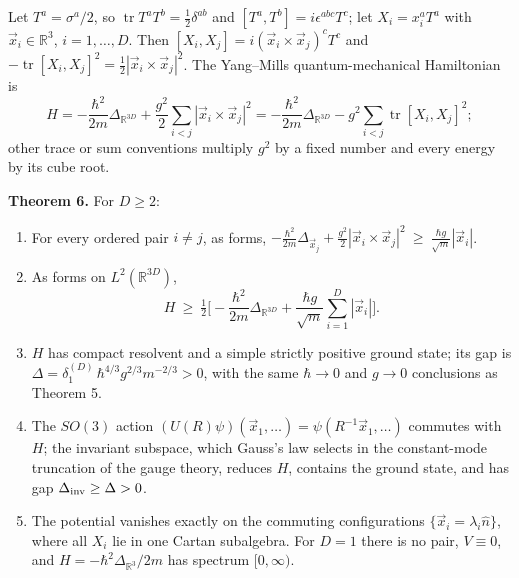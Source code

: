 \documentclass[11pt,a4paper]{article}
\newcommand{\tightlist}{\setlength{\itemsep}{0pt}\setlength{\parskip}{0pt}}
\begin{document}
Let \(T^a=\sigma^a/2\), so
\(\operatorname{tr}T^aT^b=\tfrac12\delta^{ab}\) and
\([T^a,T^b]=i\epsilon^{abc}T^c\); let \(X_i=x_i^aT^a\) with
\(\vec x_i\in\mathbb R^3\), \(i=1,\dots,D\). Then
\([X_i,X_j]=i(\vec x_i\times\vec x_j)^cT^c\) and
\(-\operatorname{tr}[X_i,X_j]^2=\tfrac12|\vec x_i\times\vec x_j|^2\).
The Yang--Mills quantum-mechanical Hamiltonian is
\[H=-\frac{\hbar^2}{2m}\Delta_{\mathbb R^{3D}}
+\frac{g^2}{2}\sum_{i<j}|\vec x_i\times\vec x_j|^2
=-\frac{\hbar^2}{2m}\Delta_{\mathbb R^{3D}}-g^2\sum_{i<j}\operatorname{tr}[X_i,X_j]^2 ;\]
other trace or sum conventions multiply \(g^2\) by a fixed number and
every energy by its cube root.

\textbf{Theorem 6.} For \(D\ge2\):

\begin{enumerate}
\def\labelenumi{\arabic{enumi}.}
\tightlist
\item
  For every ordered pair \(i\neq j\), as forms,
  \(-\frac{\hbar^2}{2m}\Delta_{\vec x_j}+\frac{g^2}{2}|\vec x_i\times\vec x_j|^2 \ \ge\ \frac{\hbar g}{\sqrt m}|\vec x_i|\).
\item
  As forms on \(L^2(\mathbb R^{3D})\),
  \[H\ \ge\ \tfrac12\Big[-\frac{\hbar^2}{2m}\Delta_{\mathbb R^{3D}}
  +\frac{\hbar g}{\sqrt m}\sum_{i=1}^D|\vec x_i|\Big].\]
\item
  \(H\) has compact resolvent and a simple strictly positive ground
  state; its gap is
  \(\Delta=\delta_1^{(D)}\,\hbar^{4/3}g^{2/3}m^{-2/3}>0\), with the same
  \(\hbar\to0\) and \(g\to0\) conclusions as Theorem 5.
\item
  The \(SO(3)\) action
  \((U(R)\psi)(\vec x_1,\dots)=\psi(R^{-1}\vec x_1,\dots)\) commutes
  with \(H\); the invariant subspace, which Gauss's law selects in the
  constant-mode truncation of the gauge theory, reduces \(H\), contains
  the ground state, and has gap \(\Delta_{\rm inv}\ge\Delta>0\).
\item
  The potential vanishes exactly on the commuting configurations
  \(\{\vec x_i=\lambda_i\hat n\}\), where all \(X_i\) lie in one Cartan
  subalgebra. For \(D=1\) there is no pair, \(V\equiv0\), and
  \(H=-\hbar^2\Delta_{\mathbb R^3}/2m\) has spectrum \([0,\infty)\).
\end{enumerate}
\end{document}
